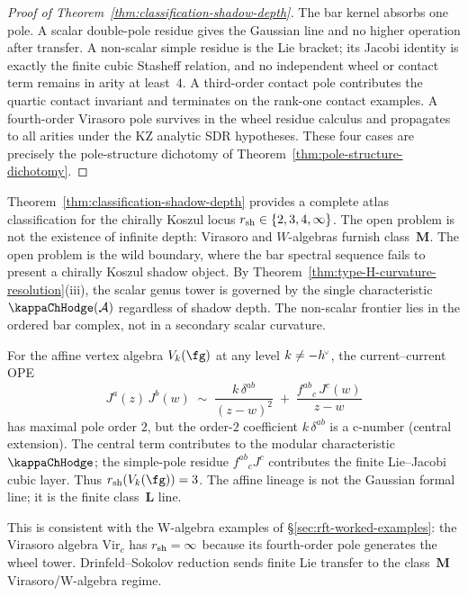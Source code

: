 \begin{proof}[Proof of Theorem~\ref{thm:classification-shadow-depth}]
The bar kernel absorbs one pole. A scalar double-pole residue gives
the Gaussian line and no higher operation after transfer. A
non-scalar simple residue is the Lie bracket; its Jacobi identity is
exactly the finite cubic Stasheff relation, and no independent
wheel or contact term remains in arity at least~$4$. A third-order
contact pole contributes the quartic contact invariant and terminates
on the rank-one contact examples. A fourth-order Virasoro pole
survives in the wheel residue calculus and propagates to all arities
under the KZ analytic SDR hypotheses. These four cases are precisely
the pole-structure dichotomy of
Theorem~\ref{thm:pole-structure-dichotomy}.
\end{proof}

\begin{remark}
\label{rem:classification-scope}
Theorem~\ref{thm:classification-shadow-depth} provides a complete
atlas classification for the chirally Koszul locus
$r_{\mathrm{sh}}\in\{2,3,4,\infty\}$. The open problem is not the
existence of infinite depth: Virasoro and $W$-algebras furnish
class~$\mathbf M$. The open problem is the wild boundary, where
the bar spectral sequence fails to present a chirally Koszul
shadow object.
By Theorem~\ref{thm:type-H-curvature-resolution}\textup{(iii)},
the scalar genus tower is governed by the single characteristic
$\kappaChHodge(\cA)$ regardless of shadow depth. The non-scalar
frontier lies in the ordered bar complex, not in a secondary scalar
curvature.
\end{remark}

\begin{remark}
\label{rem:affine-type-F}
For the affine vertex algebra $V_k(\fg)$ at any level
$k \neq -h^{\!\scriptscriptstyle\vee}$, the current--current OPE
\[
J^a(z)\, J^b(w)
\;\sim\;
\frac{k\, \delta^{ab}}{(z - w)^2}
\;+\;
\frac{f^{ab}{}_{c}\, J^c(w)}{z - w}
\]
has maximal pole order $2$, but the order-$2$ coefficient
$k\, \delta^{ab}$ is a c-number (central extension).
The central term contributes to the modular characteristic
$\kappaChHodge$; the simple-pole residue
$f^{ab}{}_{c}J^c$ contributes the finite Lie--Jacobi cubic
layer. Thus $\dalg(V_k(\fg))=3$. The affine lineage is not the
Gaussian formal line; it is the finite class~$\mathbf L$ line.

This is consistent with the W-algebra examples of
\S\ref{sec:rft-worked-examples}: the Virasoro algebra $\mathrm{Vir}_c$
has $r_{\mathrm{sh}}=\infty$ because its fourth-order pole generates the
wheel tower. Drinfeld--Sokolov reduction sends finite Lie transfer
to the class~$\mathbf M$ Virasoro/W-algebra regime.
\end{remark}

